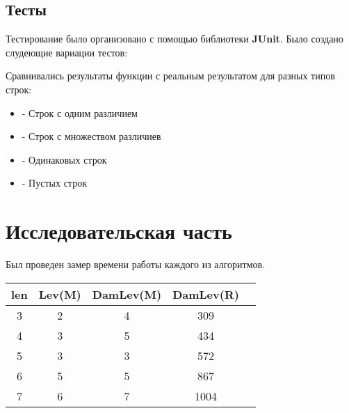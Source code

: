 ﻿\documentclass[12pt]{report}
\begin{document}
\section{Тесты}
Тестирование было организовано с помощью библиотеки  \textbf{JUnit}.
Было создано слудеющие вариации тестов:


Сравнивались результаты функции с реальным результатом для разных типов строк:
\begin{itemize}
	\item  - Строк с одним различием
	\item  - Строк с множеством различиев
	\item  - Одинаковых строк
	\item  - Пустых строк
\end{itemize}


\chapter{Исследовательская часть}


Был проведен замер времени работы каждого из алгоритмов.

\begin{center}
	\begin{tabular}{|c c c c c|} 
 	\hline
	len & Lev(M) & DamLev(M)  & DamLev(R) \\ [0.5ex] 
 	\hline\hline
 	3 & 2 & 4 & 309 &\\
 	\hline
 	4 & 3 & 5 & 434 &\\
 	\hline
	5 & 3 & 3 & 572 &\\
	\hline
	6 & 5 & 5 & 867 &\\
	\hline
	7 & 6 & 7 & 1004 &\\
	\end{tabular}
\end{center}




\end{document}
